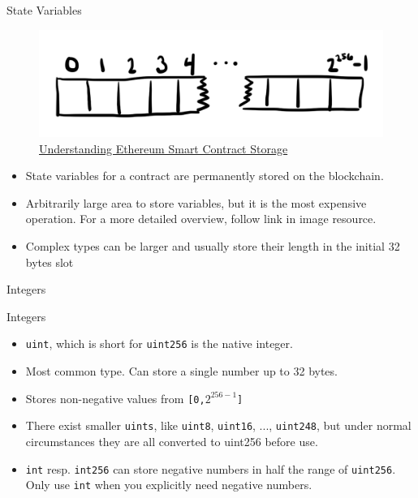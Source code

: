 \documentclass[handout]{beamer}
\begin{document}
\begin{frame}{State Variables}

	\begin{figure}
		\includegraphics[scale=0.2]{../assets/images/sc_storage}
\caption{\link \href{https://programtheblockchain.com/posts/2018/03/09/understanding-ethereum-smart-contract-storage/}{Understanding Ethereum Smart Contract Storage}}
		\label{fig:sc_storage}
	\end{figure}

	\begin{itemize}
		\item State variables for a contract are permanently stored on the blockchain.
		\item Arbitrarily large area to store variables, but it is the most expensive operation. For a more detailed overview, follow link in image resource.
		\item Complex types can be larger and usually store their length in the initial 32 bytes slot
	\end{itemize}

\end{frame}

\begin{frame}{Integers}

	\begin{samplecode}{Integers}
		
	\end{samplecode}
	\begin{itemize}
		\item<2->{\texttt{uint}, which is short for \texttt{uint256} is the native integer.}
		\item<3->{Most common type. Can store a single number up to 32 bytes.}
		\item<4->{Stores non-negative values from \texttt{[0,$2^{256-1}$]}}
		\item<5->{There exist smaller \texttt{uints}, like \texttt{uint8}, \texttt{uint16}, ..., \texttt{uint248}, but under normal circumstances they are all converted to uint256 before use.}
		\item<6->{\texttt{int} resp. \texttt{int256} can store negative numbers in half the range of \texttt{uint256}. Only use \texttt{int} when you explicitly need negative numbers. }
	\end{itemize}

\end{frame}
\end{document}
